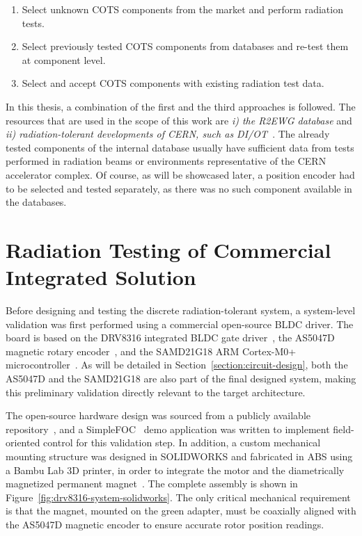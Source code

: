 \begin{enumerate}
    \item Select unknown COTS components from the market and perform radiation tests.
    \item Select previously tested COTS components from databases and re-test them at component level.
    \item Select and accept COTS components with existing radiation test data.
\end{enumerate}

In this thesis, a combination of the first and the third approaches is followed. The resources that are used in the scope of this work are \textit{i) the R2EWG database} and \textit{ii) radiation-tolerant developments of CERN, such as DI/OT~\cite{ratopus_jacow}}. The already tested components of the internal database usually have sufficient data from tests performed in radiation beams or environments representative of the CERN accelerator complex. Of course, as will be showcased later, a position encoder had to be selected and tested separately, as there was no such component available in the databases.

\section{Radiation Testing of Commercial Integrated Solution}

Before designing and testing the discrete radiation-tolerant system, a system-level validation was first performed using a commercial open-source BLDC driver. The board is based on the DRV8316 integrated BLDC gate driver~\cite{ti_drv8316}, the AS5047D magnetic rotary encoder~\cite{ams_as5047d}, and the SAMD21G18 ARM Cortex-M0+ microcontroller~\cite{microchip_samd21}. As will be detailed in Section~\ref{section:circuit-design}, both the AS5047D and the SAMD21G18 are also part of the final designed system, making this preliminary validation directly relevant to the target architecture.

The open-source hardware design was sourced from a publicly available repository~\cite{adinack_motor_controller}, and a SimpleFOC~\cite{simplefoc} demo application was written to implement field-oriented control for this validation step.
In addition, a custom mechanical mounting structure was designed in SOLIDWORKS and fabricated in ABS using a Bambu Lab 3D printer, in order to integrate the motor and the diametrically magnetized permanent magnet~\cite{simplefoc_magnet_placement}. The complete assembly is shown in Figure~\ref{fig:drv8316-system-solidworks}. The only critical mechanical requirement is that the magnet, mounted on the green adapter, must be coaxially aligned with the AS5047D magnetic encoder to ensure accurate rotor position readings.

